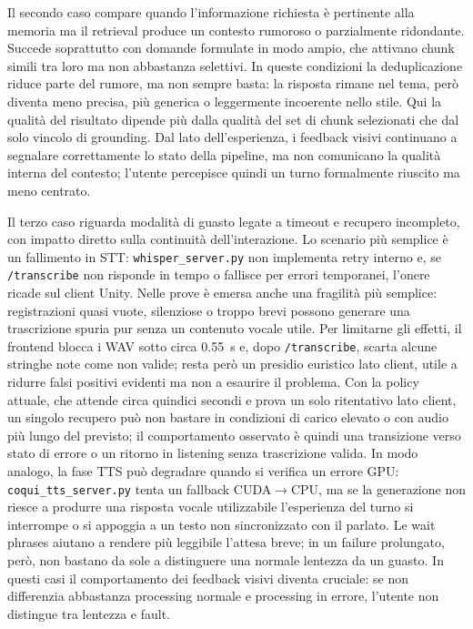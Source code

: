 Il secondo caso compare quando l'informazione richiesta è pertinente alla memoria ma il retrieval produce un contesto rumoroso o parzialmente ridondante. Succede soprattutto con domande formulate in modo ampio, che attivano chunk simili tra loro ma non abbastanza selettivi. In queste condizioni la deduplicazione riduce parte del rumore, ma non sempre basta: la risposta rimane nel tema, però diventa meno precisa, più generica o leggermente incoerente nello stile. Qui la qualità del risultato dipende più dalla qualità del set di chunk selezionati che dal solo vincolo di grounding. Dal lato dell'esperienza, i feedback visivi continuano a segnalare correttamente lo stato della pipeline, ma non comunicano la qualità interna del contesto; l'utente percepisce quindi un turno formalmente riuscito ma meno centrato.

{\setlength{\emergencystretch}{2em}\hfuzz=20pt
Il terzo caso riguarda modalità di guasto legate a timeout e recupero incompleto, con impatto diretto sulla continuità dell'interazione. Lo scenario più semplice è un fallimento in STT: \texttt{whisper\_\allowbreak server.py} non implementa retry interno e, se \texttt{/transcribe} non risponde in tempo o fallisce per errori temporanei, l'onere ricade sul client Unity. Nelle prove è emersa anche una fragilità più semplice: registrazioni quasi vuote, silenziose o troppo brevi possono generare una trascrizione spuria pur senza un contenuto vocale utile. Per limitarne gli effetti, il frontend blocca i WAV sotto circa \SI{0.55}{\second} e, dopo \texttt{/transcribe}, scarta alcune stringhe note come non valide; resta però un presidio euristico lato client, utile a ridurre falsi positivi evidenti ma non a esaurire il problema. Con la policy attuale, che attende circa quindici secondi e prova un solo ritentativo lato client, un singolo recupero può non bastare in condizioni di carico elevato o con audio più lungo del previsto; il comportamento osservato è quindi una transizione verso stato di errore o un ritorno in listening senza trascrizione valida. In modo analogo, la fase TTS può degradare quando si verifica un errore GPU: \texttt{coqui\_tts\_server.py} tenta un fallback CUDA$\rightarrow$CPU, ma se la generazione non riesce a produrre una risposta vocale utilizzabile l'esperienza del turno si interrompe o si appoggia a un testo non sincronizzato con il parlato. Le wait phrases aiutano a rendere più leggibile l'attesa breve; in un failure prolungato, però, non bastano da sole a distinguere una normale lentezza da un guasto. In questi casi il comportamento dei feedback visivi diventa cruciale: se non differenzia abbastanza processing normale e processing in errore, l'utente non distingue tra lentezza e fault.\par}

